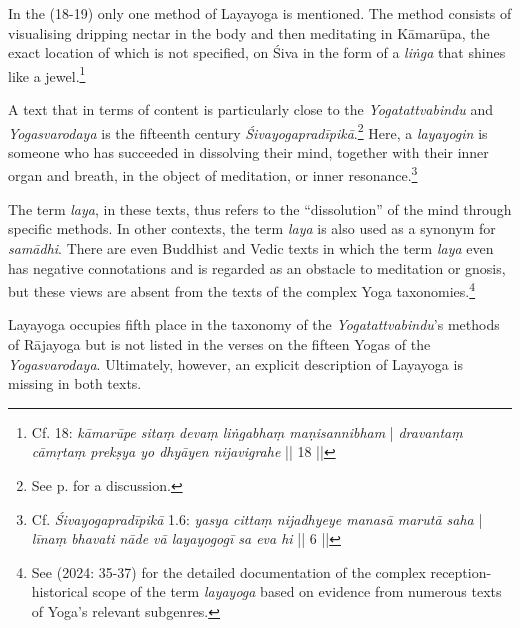 In the  (18-19) only one method of Layayoga is mentioned. The method consists of visualising dripping nectar in the body and then meditating in Kāmarūpa, the exact location of which is not specified, on Śiva in the form of a \textit{liṅga} that shines like a jewel.\footnote{Cf.  18: \textit{kāmarūpe sitaṃ devaṃ liṅgabhaṃ maṇisannibham } | \textit{dravantaṃ cāmṛtaṃ prekṣya yo dhyāyen nijavigrahe} || 18 ||}

A text that in terms of content is particularly close to the \textit{Yogatattvabindu} and \textit{Yogasvarodaya} is the fifteenth century \emph{Śivayogapradīpikā}.\footnote{See p. \pageref{sivayogaintro2} for a discussion.} Here, a \textit{layayogin} is someone who has succeeded in dissolving their mind, together with their inner organ and breath, in the object of meditation, or inner resonance.\footnote{Cf. \emph{Śivayogapradīpikā} 1.6: \textit{yasya cittaṃ nijadhyeye manasā marutā saha} | \textit{līnaṃ bhavati nāde vā layayogogī sa eva hi} || 6 ||} 

 The term \textit{laya}, in these texts, thus refers to the ``dissolution'' of the mind through specific methods. In other contexts, the term \textit{laya} is also used as a synonym for \textit{samādhi}. There are even Buddhist and Vedic texts in which the term \textit{laya} even has negative connotations and is regarded as an obstacle to meditation or gnosis, but these views are absent from the texts of the complex Yoga taxonomies.\footnote{See \citeauthor{amaraugha2024} (2024: 35-37) for the detailed documentation of the complex reception-historical scope of the term \textit{layayoga} based on evidence from numerous texts of Yoga's relevant subgenres.}

 Layayoga occupies fifth place in the taxonomy of the \textit{Yogatattvabindu}'s methods of Rājayoga but is not listed in the verses on the fifteen Yogas of the \textit{Yogasvarodaya}. Ultimately, however, an explicit description of Layayoga is missing in both texts.

